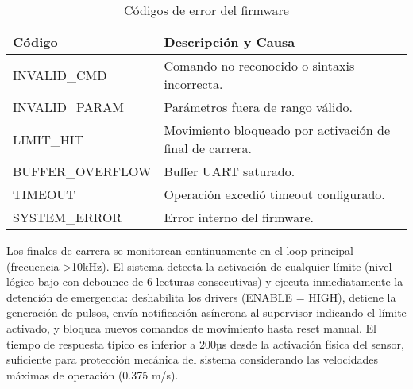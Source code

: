 \begin{table}[H]
\centering
\begin{tabular}{|l|p{9cm}|}
\hline
\textbf{Código} & \textbf{Descripción y Causa} \\
\hline
INVALID\_CMD & Comando no reconocido o sintaxis incorrecta. \\
\hline
INVALID\_PARAM & Parámetros fuera de rango válido. \\
\hline
LIMIT\_HIT & Movimiento bloqueado por activación de final de carrera. \\
\hline
BUFFER\_OVERFLOW & Buffer UART saturado. \\
\hline
TIMEOUT & Operación excedió timeout configurado. \\
\hline
SYSTEM\_ERROR & Error interno del firmware. \\
\hline
\end{tabular}
\caption{Códigos de error del firmware}
\label{tab:codigos_error}
\end{table}

Los finales de carrera se monitorean continuamente en el loop principal (frecuencia >10kHz). El sistema detecta la activación de cualquier límite (nivel lógico bajo con debounce de 6 lecturas consecutivas) y ejecuta inmediatamente la detención de emergencia: deshabilita los drivers (ENABLE = HIGH), detiene la generación de pulsos, envía notificación asíncrona al supervisor indicando el límite activado, y bloquea nuevos comandos de movimiento hasta reset manual. El tiempo de respuesta típico es inferior a 200µs desde la activación física del sensor, suficiente para protección mecánica del sistema considerando las velocidades máximas de operación (0.375 m/s).
